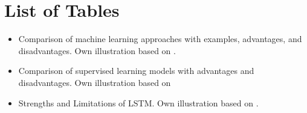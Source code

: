 \lhead{}
\section*{List of Tables}

\begin{itemize}

  \item[Table \ref{tab:AI_approaches}:] Comparison of machine learning approaches with examples, advantages, and disadvantages. Own illustration based on \cite{AI-Definition}.
  
  \item[Table \ref{tab:supervised_learning_models}:] Comparison of supervised learning models with advantages and disadvantages. Own illustration based on \cite{decision_tree_explain}\cite{breiman2001randomforests}\cite{LSTM_understanding}\cite{iForest}
  
  \item[Table \ref{tab:lstm_strengths_limitations}:] Strengths and Limitations of LSTM. Own illustration based on \cite{LSTM_understanding}.

\end{itemize}
\pagebreak
